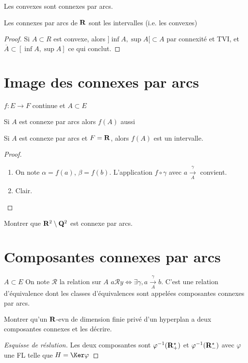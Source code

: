 \begin{ex}
Les convexes sont connexes par arcs.
\end{ex}

\begin{prop}
    Les connexes par arcs de $\mathbf R$ sont les intervalles (i.e. les convexes)
\end{prop}

\begin{proof}
    Si $A\subset R$ est convexe, alors  $]\inf A, \sup A[\subset A$ par connexité et TVI, et $\overline{ A }\subset [\inf A, \sup A]$ ce qui conclut.
\end{proof}

\section{Image des connexes par arcs}

\begin{thm}
\Hyp $f:E\to F$ continue et $A\subset E$
 \begin{concenum}
 \item Si $A$ est connexe par arcs alors $f(A)$ aussi
 \item Si  $A$ est connexe par arcs et  $F=\mathbf R$, alors $f(A)$ est un intervalle.
\end{concenum}
\end{thm}

\begin{proof}~
\begin{enumerate}
    \item On note $\alpha = f(a)$,  $\beta=f(b)$. L'application  $f\circ \gamma$ avec  $a \xrightarrow[A]{\gamma}$ convient.
    \item Clair.
\end{enumerate}
\end{proof}

\begin{exo}
Montrer que $\mathbf R^2\setminus \mathbf Q^2$ est connexe par arcs.
\end{exo}

\section{Composantes connexes par arcs}

\begin{defprop}
\Hyp $A\subset E$
\Conc On note  $\mathcal  R$ la relation sur $A$  $a\mathcal Ry\iff \exists \gamma , a \xrightarrow[A]{\gamma}b$. C'est une relation d'équivalence dont les classes d'équivalences sont appelées composantes connexes par arcs.
\end{defprop}

\begin{exo}
    Montrer qu'un $\mathbf R$-evn de dimension finie privé d'un hyperplan a deux composantes connexes et les décrire.
\end{exo}

\begin{proof}[Esquisse de réslution]
    Les deux composantes sont $\varphi^{-1}(\mathbf R_+^\star)$ et $\varphi^{-1}(\mathbf R_-^\star)$ avec $\varphi$ une FL telle que $H=\Ker\varphi$
\end{proof}

\endchapter
